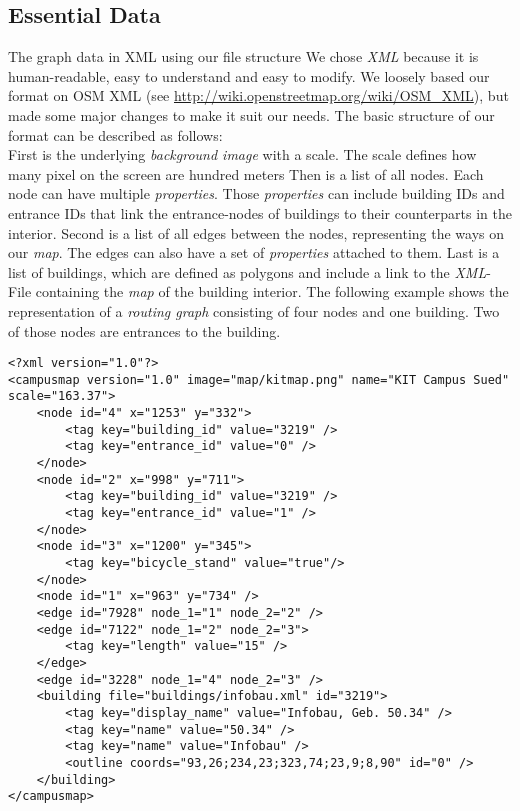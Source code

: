 \subsection{Essential Data}

\begin{numerate}[D]

	\item  [The graph data in XML using our file structure] We chose \textit{XML} because it is human-readable, easy to 	understand and easy to modify.
			We loosely based our format on OSM XML (see \url{http://wiki.openstreetmap.org/wiki/OSM_XML}), but made some major changes to make it suit our needs.
			The basic structure of our format can be described as follows: \\
			First is the underlying \textit{background image} with a scale. The scale defines how many pixel on the screen are hundred meters
			Then is a list of all nodes. Each node can have multiple \textit{properties}. Those \textit{properties} can include
			building IDs and entrance IDs that link the entrance-nodes of buildings to their counterparts in the interior.
			Second is a list of all edges between the nodes, representing the ways on our \textit{map}.
			The edges can also have a set of \textit{properties} attached to them.
			Last is a list of buildings, which are defined as polygons and include a link to the \textit{XML}-File
			containing the \textit{map} of the building interior.
			The following example shows the representation of a \textit{routing graph} consisting of four nodes and one building.
			Two of those nodes are entrances to the building.\\

	\begin{minipage}{\textwidth}
	\lstset{language=XML}
	\begin{lstlisting}
<?xml version="1.0"?>
<campusmap version="1.0" image="map/kitmap.png" name="KIT Campus Sued" scale="163.37">
	<node id="4" x="1253" y="332">
		<tag key="building_id" value="3219" />
		<tag key="entrance_id" value="0" />
	</node>
	<node id="2" x="998" y="711">
		<tag key="building_id" value="3219" />
		<tag key="entrance_id" value="1" />
	</node>
	<node id="3" x="1200" y="345">
		<tag key="bicycle_stand" value="true"/>
	</node>
	<node id="1" x="963" y="734" />
	<edge id="7928" node_1="1" node_2="2" />
	<edge id="7122" node_1="2" node_2="3">
		<tag key="length" value="15" />
	</edge>
	<edge id="3228" node_1="4" node_2="3" />
	<building file="buildings/infobau.xml" id="3219">
		<tag key="display_name" value="Infobau, Geb. 50.34" />
		<tag key="name" value="50.34" />
		<tag key="name" value="Infobau" />
		<outline coords="93,26;234,23;323,74;23,9;8,90" id="0" />
	</building>
</campusmap>
	\end{lstlisting}
	\end{minipage}


\end{numerate}
